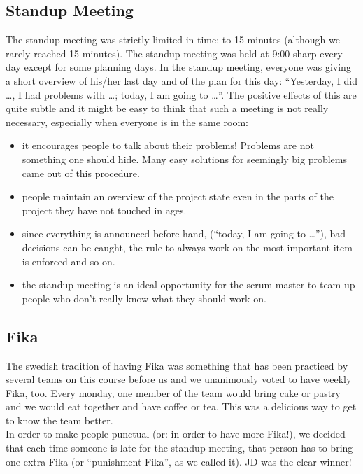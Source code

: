 \documentclass[11pt,a4paper]{report}
\begin{document}
\subsection{Standup Meeting}
The standup meeting was strictly limited in time: to 15 minutes (although we
rarely reached 15 minutes). The standup meeting was held at 9:00 sharp every day
except for some planning days. In the standup meeting, everyone was giving a
short overview of his/her last day and of the plan for this day: ``Yesterday, I
did \ldots, I had problems with \ldots; today, I am going to \ldots''.
The positive effects of this are quite subtle and it might be easy to think that
such a meeting is not really necessary, especially when everyone is in the same
room:\\
\begin{itemize}
\item it encourages people to talk about their problems!
  Problems are not something one should hide. Many easy solutions for seemingly
  big problems came out of this procedure.
\item people maintain an overview of the project state even in the parts of the
  project they have not touched in ages.
\item since everything is announced before-hand,
  (``today, I am going to \ldots''), bad decisions can be caught, the rule to
  always work on the most important item is enforced and so on.
\item the standup meeting is an ideal opportunity for the scrum master to team
  up people who don't really know what they should work on.
\end{itemize}
\subsection{Fika}
The swedish tradition of having Fika was something that has been practiced by
several teams on this course before us and we unanimously voted to have weekly
Fika, too. Every monday, one member of the team would bring cake or pastry and
we would eat together and have coffee or tea. This was a delicious way to get to
know the team better. \\
In order to make people punctual (or: in order to have more Fika!), we decided
that each time someone is late for the standup meeting, that person has to
bring one extra Fika (or ``punishment Fika'', as we called it).
JD was the clear winner!
\end{document}
